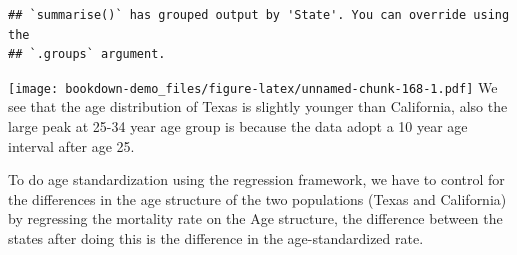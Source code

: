 \documentclass[
]{article}
\newenvironment{Shaded}{\begin{snugshade}}{\end{snugshade}}
\newcommand{\AttributeTok}[1]{\textcolor[rgb]{0.77,0.63,0.00}{#1}}
\newcommand{\ConstantTok}[1]{\textcolor[rgb]{0.00,0.00,0.00}{#1}}
\newcommand{\FunctionTok}[1]{\textcolor[rgb]{0.00,0.00,0.00}{#1}}
\newcommand{\NormalTok}[1]{#1}
\newcommand{\OtherTok}[1]{\textcolor[rgb]{0.56,0.35,0.01}{#1}}
\newcommand{\SpecialCharTok}[1]{\textcolor[rgb]{0.00,0.00,0.00}{#1}}
\newcommand{\StringTok}[1]{\textcolor[rgb]{0.31,0.60,0.02}{#1}}
\begin{document}
\begin{verbatim}
## `summarise()` has grouped output by 'State'. You can override using the
## `.groups` argument.
\end{verbatim}

\texttt{[image: bookdown-demo\_files/figure-latex/unnamed-chunk-168-1.pdf]}
We see that the age distribution of Texas is slightly younger than California, also the large peak at 25-34 year age group is because the data adopt a 10 year age interval after age 25.

To do age standardization using the regression framework, we have to control for the differences in the age structure of the two populations (Texas and California) by regressing the mortality rate on the Age structure, the difference between the states after doing this is the difference in the age-standardized rate.

\begin{Shaded}
\end{Shaded}
\end{document}
